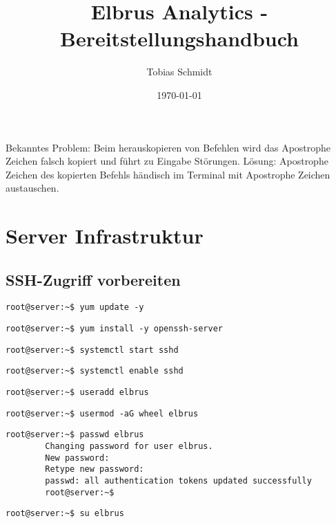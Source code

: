 \documentclass{article}
\begin{document}
	\title{Elbrus Analytics - Bereitstellungshandbuch}
	\author{Tobias Schmidt}
	\date{\today}
	\maketitle
	\newpage
	
	Bekanntes Problem: Beim herauskopieren von Befehlen wird das Apostrophe Zeichen falsch kopiert und führt zu Eingabe Störungen. Lösung: Apostrophe Zeichen des kopierten Befehls händisch im Terminal mit Apostrophe Zeichen austauschen. 
	\section[Server Infrastruktur]{Server Infrastruktur}
	\subsection{SSH-Zugriff vorbereiten}
	\lstset{style=commands}
	\begin{lstlisting}[caption={Updaten vorhandener Packages.}]
		root@server:~$ yum update -y
	\end{lstlisting}
	\begin{lstlisting}[caption={Installieren des 'ssh' Packages.}]
		root@server:~$ yum install -y openssh-server
	\end{lstlisting}
	\begin{lstlisting}[caption={Starten des 'sshd' Services.}]
		root@server:~$ systemctl start sshd
	\end{lstlisting}
	\begin{lstlisting}[caption={Aktivieren des 'sshd' Services.}]
		root@server:~$ systemctl enable sshd
	\end{lstlisting}
	\begin{lstlisting}[caption={Anlegen des Users Elbrus.}]
		root@server:~$ useradd elbrus
	\end{lstlisting}
	\begin{lstlisting}[caption={Hinzufügen des Users Elbrus zu der Gruppe 'wheel'.}]
		root@server:~$ usermod -aG wheel elbrus
	\end{lstlisting}
	\begin{lstlisting}[caption={Ändern des Passwords für den User Elbrus.}]
		root@server:~$ passwd elbrus
		Changing password for user elbrus.
		New password:
		Retype new password:
		passwd: all authentication tokens updated successfully
		root@server:~$
	\end{lstlisting}
	\begin{lstlisting}[caption={Wechseln zu User elbrus.}]
		root@server:~$ su elbrus
	\end{lstlisting}
	\newpage
	
\end{document}

